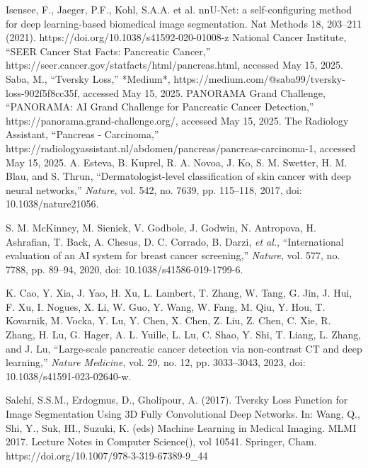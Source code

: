 \documentclass[conference]{IEEEtran}
\begin{document}
\begin{thebibliography}{00}
 Isensee, F., Jaeger, P.F., Kohl, S.A.A. et al. nnU-Net: a self-configuring method for deep learning-based biomedical image segmentation. Nat Methods 18, 203–211 (2021). https://doi.org/10.1038/s41592-020-01008-z
 National Cancer Institute, ``SEER Cancer Stat Facts: Pancreatic Cancer,'' https://seer.cancer.gov/statfacts/html/pancreas.html, accessed May 15, 2025.
 Saba, M., ``Tversky Loss,'' *Medium*, https://medium.com/@saba99/tversky-loss-902f5f8cc35f, accessed May 15, 2025.
 PANORAMA Grand Challenge, ``PANORAMA: AI Grand Challenge for Pancreatic Cancer Detection,'' https://panorama.grand-challenge.org/, accessed May 15, 2025.
 The Radiology Assistant, ``Pancreas - Carcinoma,'' https://radiologyassistant.nl/abdomen/pancreas/pancreas-carcinoma-1, accessed May 15, 2025.
 A. Esteva, B. Kuprel, R. A. Novoa, J. Ko, S. M. Swetter, H. M. Blau, and S. Thrun, ``Dermatologist-level classification of skin cancer with deep neural networks,'' \textit{Nature}, vol. 542, no. 7639, pp. 115--118, 2017, doi: 10.1038/nature21056.

 S. M. McKinney, M. Sieniek, V. Godbole, J. Godwin, N. Antropova, H. Ashrafian, T. Back, A. Chesus, D. C. Corrado, B. Darzi, \textit{et al.}, ``International evaluation of an AI system for breast cancer screening,'' \textit{Nature}, vol. 577, no. 7788, pp. 89--94, 2020, doi: 10.1038/s41586-019-1799-6.

 K. Cao, Y. Xia, J. Yao, H. Xu, L. Lambert, T. Zhang, W. Tang, G. Jin, J. Hui, F. Xu, I. Nogues, X. Li, W. Guo, Y. Wang, W. Fang, M. Qiu, Y. Hou, T. Kovarnik, M. Vocka, Y. Lu, Y. Chen, X. Chen, Z. Liu, Z. Chen, C. Xie, R. Zhang, H. Lu, G. Hager, A. L. Yuille, L. Lu, C. Shao, Y. Shi, T. Liang, L. Zhang, and J. Lu, ``Large-scale pancreatic cancer detection via non-contrast CT and deep learning,'' \textit{Nature Medicine}, vol. 29, no. 12, pp. 3033--3043, 2023, doi: 10.1038/s41591-023-02640-w.




 Salehi, S.S.M., Erdogmus, D., Gholipour, A. (2017). Tversky Loss Function for Image Segmentation Using 3D Fully Convolutional Deep Networks. In: Wang, Q., Shi, Y., Suk, HI., Suzuki, K. (eds) Machine Learning in Medical Imaging. MLMI 2017. Lecture Notes in Computer Science(), vol 10541. Springer, Cham. https://doi.org/10.1007/978-3-319-67389-9_44


\end{thebibliography}
\end{document}
